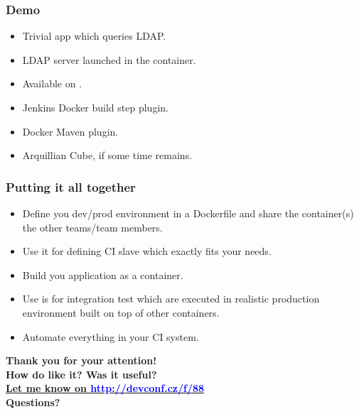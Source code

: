 \documentclass[10pt,utf8]{beamer}
\begin{document}
\begin{frame}
	\frametitle{Demo}
	\begin{itemize}
		\item Trivial app which queries LDAP.
		\item LDAP server launched in the container.
		\item Available on \href{https://github.com/vjuranek/presentations/tree/master/DevConf_Brno2015/demo/docker-maven-demo}{}.
	\end{itemize}
	
	\vspace{0.5cm}
	
	\begin{itemize}
		\item Jenkins Docker build step plugin.
		\item Docker Maven plugin.
	\end{itemize}
	
	\vspace{0.5cm}
	
	\begin{itemize}
		\item Arquillian Cube, if some time remains.
	\end{itemize}
\end{frame}

\begin{frame}
	\frametitle{Putting it all together}
	\begin{itemize}
		\item Define you dev/prod environment in a Dockerfile and share the container(s) the other teams/team members.
		\item Use it for defining CI slave which exactly fits your needs.
		\item Build you application as a container.
		\item Use is for integration test which are executed in realistic production environment built on top of other containers.
		\item Automate everything in your CI system.
	\end{itemize}
\end{frame}

\begin{frame}
	\centering
	\huge{\textbf{Thank you for your attention!}} \\
	\vspace{1cm}
	\Large{\textbf{How do like it? Was it useful?}} \\
	\Large{\textbf{\href{http://devconf.cz/f/88}{Let me know on \textcolor{blue}{http://devconf.cz/f/88}}}}\\
	\vspace{1cm}
	\huge{\textbf{Questions?}}
\end{frame}
\end{document}
